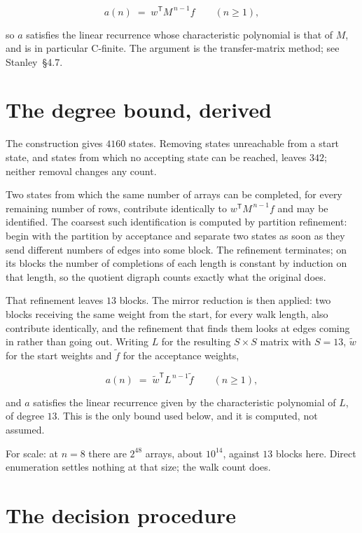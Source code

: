 \documentclass[11pt]{article}
\theoremstyle{definition}
\begin{document}
\[a(n) \;=\; w^{\mathsf T} M^{\,n-1} f \qquad (n \ge 1),\]

so $a$ satisfies the linear recurrence whose characteristic polynomial is that of $M$, and is in particular C-finite. The argument is the transfer-matrix method; see Stanley~\S4.7.

\section{The degree bound, derived}

The construction gives $4160$ states. Removing states unreachable from a start state, and states from which no accepting state can be reached, leaves $342$; neither removal changes any count.

Two states from which the same number of arrays can be completed, for every remaining number of rows, contribute identically to $w^{\mathsf T}M^{\,n-1}f$ and may be identified. The coarsest such identification is computed by partition refinement: begin with the partition by acceptance and separate two states as soon as they send different numbers of edges into some block. The refinement terminates; on its blocks the number of completions of each length is constant by induction on that length, so the quotient digraph counts exactly what the original does.

That refinement leaves $13$ blocks. The mirror reduction is then applied: two blocks receiving the same weight from the start, for every walk length, also contribute identically, and the refinement that finds them looks at edges coming in rather than going out. Writing $L$ for the resulting $S \times S$ matrix with $S = 13$, $\tilde w$ for the start weights and $\tilde f$ for the acceptance weights,

\[a(n) \;=\; \tilde w^{\mathsf T} L^{\,n-1} \tilde f \qquad (n \ge 1),\]

and $a$ satisfies the linear recurrence given by the characteristic polynomial of $L$, of degree $13$. This is the only bound used below, and it is computed, not assumed.

For scale: at $n = 8$ there are $2^{48}$ arrays, about $10^{14}$, against $13$ blocks here. Direct enumeration settles nothing at that size; the walk count does.

\section{The decision procedure}
\end{document}
